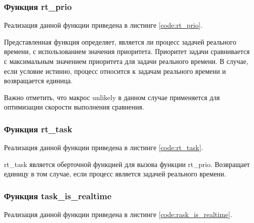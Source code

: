 \subsubsection{Функция rt\_prio}
Реализация данной функции приведена в листинге \ref{code:rt_prio}.


Представленная функция определяет, является ли процесс задачей реального времени, с использованием значения приоритета. Приоритет задачи сравнивается с максимальным значением приоритета для задачи реального времени. В случае, если условие истинно, процесс относится к задачам реального времени и возвращается единица.

Важно отметить, что макрос unlikely в данном случае применяется для оптимизации скорости выполнения сравнения.

\subsubsection{Функция rt\_task}
Реализация данной функции приведена в листинге \ref{code:rt_task}.


rt\_task является оберточной функцией для вызова функции rt\_prio. Возвращает единицу в том случае, если процесс является задачей реального времени.

\subsubsection{Функция task\_is\_realtime}
Реализация данной функции приведена в листинге \ref{code:rask_is_realtime}.



